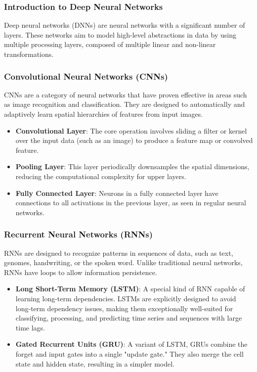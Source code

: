 \subsubsection{Introduction to Deep Neural Networks}

Deep neural networks (DNNs) are neural networks with a significant number of layers. These networks aim to model high-level abstractions in data by using multiple processing layers, composed of multiple linear and non-linear transformations.

\subsubsection{Convolutional Neural Networks (CNNs)}

CNNs are a category of neural networks that have proven effective in areas such as image recognition and classification. They are designed to automatically and adaptively learn spatial hierarchies of features from input images.

\begin{itemize}
    \item \textbf{Convolutional Layer}: The core operation involves sliding a filter or kernel over the input data (such as an image) to produce a feature map or convolved feature.
    \item \textbf{Pooling Layer}: This layer periodically downsamples the spatial dimensions, reducing the computational complexity for upper layers.
    \item \textbf{Fully Connected Layer}: Neurons in a fully connected layer have connections to all activations in the previous layer, as seen in regular neural networks.
\end{itemize}

\subsubsection{Recurrent Neural Networks (RNNs)}

RNNs are designed to recognize patterns in sequences of data, such as text, genomes, handwriting, or the spoken word. Unlike traditional neural networks, RNNs have loops to allow information persistence.

\begin{itemize}
    \item \textbf{Long Short-Term Memory (LSTM)}: A special kind of RNN capable of learning long-term dependencies. LSTMs are explicitly designed to avoid long-term dependency issues, making them exceptionally well-suited for classifying, processing, and predicting time series and sequences with large time lags.
    \item \textbf{Gated Recurrent Units (GRU)}: A variant of LSTM, GRUs combine the forget and input gates into a single "update gate." They also merge the cell state and hidden state, resulting in a simpler model.
\end{itemize}

